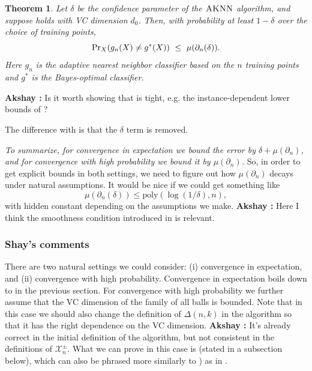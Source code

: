 \documentclass{article}
\def\pr{{\rm Pr}}
\def\X{{\mathcal X}}
\newcommand{\algname}{\textsc{AKNN}}
\newtheorem{theorem}{Theorem}
\newcommand{\comment}[3]{{\color{#1} {\bf #2 :} #3}}
\newcommand{\akshay}[1]{\comment{blue}{Akshay}{#1}}
\begin{document}
\begin{theorem}\label{thm:fastrate2}
Let $\delta$ be the confidence parameter of the $\algname$ algorithm, and suppose  holds with VC dimension $d_0$.
Then, with probability at least $1-\delta$ over the choice of training points,
\[ \pr_{X}(g_n(X) \neq g^*(X)) \ \leq \ \mu(\partial_n (\delta)) .\]
Here $g_n$ is the adaptive nearest neighbor classifier based on the $n$ training points and $g^*$ is the Bayes-optimal classifier. 
\end{theorem}

\akshay{Is it worth showing that  is tight, e.g. the instance-dependent lower bounds of \cite{ChaudhuriDasgupta2014}?}



The difference with  is that the $\delta$ term is removed.

{\it To summarize, for convergence in expectation we bound the error by $\delta + \mu(\partial_n)$,
and for convergence with high probability we bound it by $\mu(\partial_n)$.}
So, in order to get explicit bounds in both settings, we need to figure out how $\mu(\partial_n)$ decays under natural assumptions. It would be nice if we could get something like 
\[\mu(\partial_n (\delta)) \leq \mathrm{poly}\left(\log(1/\delta), n\right),
\]
with hidden constant depending on the assumptions we make.
\akshay{Here I think the smoothness condition introduced in \cite{ChaudhuriDasgupta2014} is relevant.}

\subsubsection{Shay's comments}

There are two natural settings we could consider: (i) convergence in expectation, and (ii) convergence with high probability.
Convergence in expectation boils down to  in the previous section.
For convergence with high probability we further assume that the VC dimension of the family of all balls is bounded. 
Note that in this case we should also change the definition of $\Delta(n,k)$  in the algorithm so that it has the right dependence on the VC dimension. \akshay{It's already correct in the initial definition of the algorithm, but not consistent in the definitions of $\X^{\pm}_n$.} What we can prove in this case is  (stated in a subsection below), 
which can also be phrased more similarly to ) as in .
\end{document}
